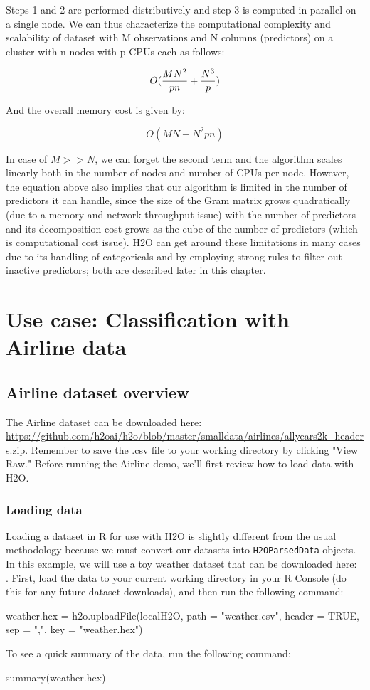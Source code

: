 \documentclass[11pt]{article}
\begin{document}
Steps 1 and 2 are performed distributively and step 3 is computed in parallel on a single node. We can thus characterize the computational complexity and scalability of dataset with M observations and N columns (predictors) on a cluster with n nodes with p CPUs each as follows:

\[ O({MN^2 \over pn} + {N^3 \over p})\]

And the overall memory cost is given by:

\[ O(MN + N^2pn)\]

In case of $M >> N$, we can forget the second term and the algorithm scales linearly both in the number of nodes and number of CPUs per node. However, the equation above also implies that our algorithm is limited in the number of predictors it can handle, since the size of the Gram matrix grows quadratically (due to a memory and network throughput issue) with the number of predictors and its decomposition cost grows as the cube of the number of predictors (which is computational cost issue). H2O can get around these limitations in many cases due to its handling of categoricals and by employing strong rules to filter out inactive predictors; both are described later in this chapter.  

\section{Use case: Classification with Airline data}


\subsection{Airline dataset overview} 

The Airline dataset can be downloaded here: \url{https://github.com/h2oai/h2o/blob/master/smalldata/airlines/allyears2k_headers.zip}. Remember to save the .csv file to your working directory by clicking  "View Raw."  Before running the Airline demo, we'll first review how to load data with H2O. 

\subsubsection{Loading data} \label{2.5}

Loading a dataset in R for use with H2O is slightly different from the usual methodology because we must convert our datasets into \texttt{H2OParsedData} objects. In this example, we will use a toy weather dataset that can be downloaded here:\\ 
. 
First, load the data to your current working directory in your R Console (do this for any future dataset downloads), and then run the following command:
\begin{spverbatim}
weather.hex = h2o.uploadFile(localH2O, path = "weather.csv", header = TRUE, sep = ",", key = "weather.hex")
\end{spverbatim}
\bigskip
\noindent
To see a quick summary of the data, run the following command:
\begin{spverbatim}
summary(weather.hex)
\end{spverbatim}
\end{document}
